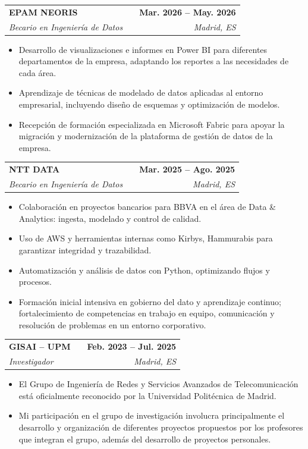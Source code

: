 \documentclass[a4paper,10pt]{article}
\makeatletter
\newcommand{\smallblacksquare}{\raisebox{0.4ex}{\rule{0.6ex}{0.6ex}}}
\newenvironment{joblong}[4]
{
	\begin{tabularx}{\linewidth}{@{}l X r@{}}
		\textbf{#1} & \hfill & \textbf{#2} \\
		\small\textit{#3} & \hfill & \small\textit{#4} \\[3.75pt]
	\end{tabularx}
	\begin{minipage}[t]{\linewidth}
		\begin{itemize}[nosep,after=\strut, leftmargin=1em, itemsep=3pt,label=\smallblacksquare]
		}
		{
		\end{itemize}
	\end{minipage}    
}
\makeatother
\begin{document}
	\begin{joblong}{EPAM NEORIS}{Mar. 2026 – May. 2026}{Becario en Ingeniería de Datos}{Madrid, ES}
		\item Desarrollo de visualizaciones e informes en Power BI para diferentes departamentos de la empresa, adaptando los reportes a las necesidades de cada área.
		\item Aprendizaje de técnicas de modelado de datos aplicadas al entorno empresarial, incluyendo diseño de esquemas y optimización de modelos.
		\item Recepción de formación especializada en Microsoft Fabric para apoyar la migración y modernización de la plataforma de gestión de datos de la empresa.
	\end{joblong}
	
	\begin{joblong}{NTT DATA}{Mar. 2025 – Ago. 2025}{Becario en Ingeniería de Datos}{Madrid, ES}
		\item Colaboración en proyectos bancarios para BBVA en el área de Data \& Analytics: ingesta, modelado y control de calidad.
		\item Uso de AWS y herramientas internas como Kirbys, Hammurabis para garantizar integridad y trazabilidad.
		\item Automatización y análisis de datos con Python, optimizando flujos y procesos.
		\item Formación inicial intensiva en gobierno del dato y aprendizaje continuo; fortalecimiento de competencias en trabajo en equipo, comunicación y resolución de problemas en un entorno corporativo.
	\end{joblong}
	
	\begin{joblong}{GISAI – UPM}{Feb. 2023 – Jul. 2025}{Investigador}{Madrid, ES}
		\item El Grupo de Ingeniería de Redes y Servicios Avanzados de Telecomunicación está oficialmente reconocido por la Universidad Politécnica de Madrid.
		\item Mi participación en el grupo de investigación involucra principalmente el desarrollo y organización de diferentes proyectos propuestos por los profesores que integran el grupo, además del desarrollo de proyectos personales.
	\end{joblong}
	
\end{document}
